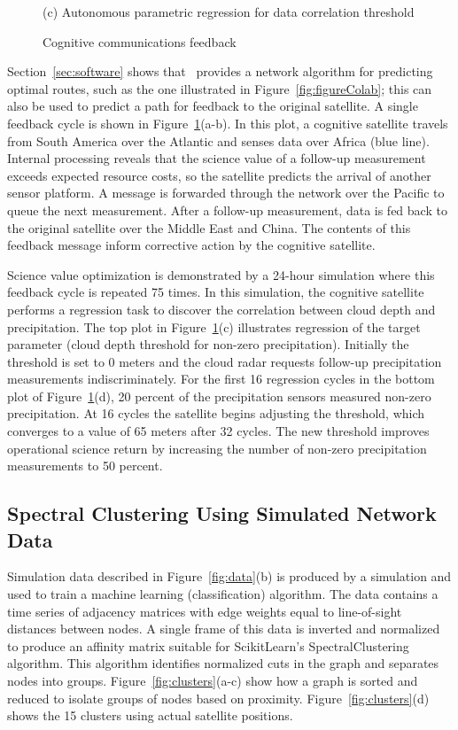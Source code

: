 \documentclass[conference]{IEEEtran}
\newcommand{\project}{{\sc{Collaborate}}~}
\begin{document}
\begin{figure}[b!]
\begin{minipage}[b]{\linewidth}
\begin{center}
      {\footnotesize(c) Autonomous parametric regression for data correlation
        threshold}
    \end{center}
  \end{minipage}
  \caption{Cognitive communications feedback}
  \label{fig:feedback}
\end{figure}

Section~\ref{sec:software} shows that \project provides a network algorithm for
predicting optimal routes, such as the one illustrated in
Figure~\ref{fig:figureColab}; this can also be used to predict a path for
feedback to the original satellite.  A single feedback cycle is shown in
Figure~\ref{fig:feedback}(a-b).  In this plot, a cognitive satellite travels
from South America over the Atlantic and senses data over Africa (blue line).
Internal processing reveals that the science value of a follow-up measurement
exceeds expected resource costs, so the satellite predicts the arrival of
another sensor platform.  A message is forwarded through the network over the
Pacific to queue the next measurement.  After a follow-up measurement, data is
fed back to the original satellite over the Middle East and China.  The contents
of this feedback message inform corrective action by the cognitive satellite.

Science value optimization is demonstrated by a 24-hour simulation where this
feedback cycle is repeated 75 times.  In this simulation, the cognitive
satellite performs a regression task to discover the correlation between cloud
depth and precipitation.  The top plot in Figure~\ref{fig:feedback}(c)
illustrates regression of the target parameter (cloud depth threshold for
non-zero precipitation).  Initially the threshold is set to 0 meters and the
cloud radar requests follow-up precipitation measurements indiscriminately.  For
the first 16 regression cycles in the bottom plot of
Figure~\ref{fig:feedback}(d), 20 percent of the precipitation sensors measured
non-zero precipitation.  At 16 cycles the satellite begins adjusting the
threshold, which converges to a value of 65 meters after 32 cycles.  The new
threshold improves operational science return by increasing the number of
non-zero precipitation measurements to 50 percent.

\subsection{Spectral Clustering Using Simulated Network Data}
\label{ssec:cluster}

Simulation data described in Figure~\ref{fig:data}(b) is produced by a
simulation and used to train a machine learning (classification) algorithm.  The
data contains a time series of adjacency matrices with edge weights equal to
line-of-sight distances between nodes.  A single frame of this data is inverted
and normalized to produce an affinity matrix suitable for ScikitLearn's
SpectralClustering algorithm.  This algorithm identifies normalized cuts in the
graph and separates nodes into groups.  Figure~\ref{fig:clusters}(a-c) show how
a graph is sorted and reduced to isolate groups of nodes based on proximity.
Figure~\ref{fig:clusters}(d) shows the 15 clusters using actual satellite
positions.
\end{document}

